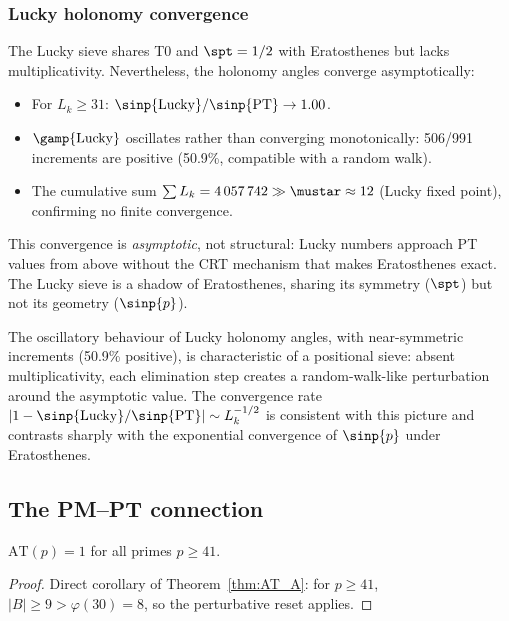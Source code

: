 \documentclass[12pt,a4paper]{article}
\begin{document}
\subsubsection{Lucky holonomy convergence}
\label{sec:PM_lucky_holonomy}

The Lucky sieve shares T0 and $\spt = 1/2$ with Eratosthenes but lacks
multiplicativity.  Nevertheless, the holonomy angles converge
asymptotically:

\begin{itemize}[nosep]
\item For $L_k \ge 31$: $\sinp{\mathrm{Lucky}} / \sinp{\mathrm{PT}} \to 1.00$.
\item $\gamp{\mathrm{Lucky}}$ oscillates rather than converging
  monotonically: 506/991 increments are positive (50.9\%, compatible
  with a random walk).
\item The cumulative sum $\sum L_k = 4\,057\,742 \gg \mustar \approx 12$
  (Lucky fixed point), confirming no finite convergence.
\end{itemize}

This convergence is \emph{asymptotic}, not structural: Lucky numbers
approach PT values from above without the CRT mechanism that makes
Eratosthenes exact.  The Lucky sieve is a shadow of Eratosthenes,
sharing its symmetry ($\spt$) but not its geometry ($\sinp{p}$).

\begin{remark}
The oscillatory behaviour of Lucky holonomy angles, with near-symmetric
increments (50.9\% positive), is characteristic of a positional sieve:
absent multiplicativity, each elimination step creates a random-walk-like
perturbation around the asymptotic value.  The convergence rate
$|1 - \sinp{\mathrm{Lucky}} / \sinp{\mathrm{PT}}| \sim L_k^{-1/2}$
is consistent with this picture and contrasts sharply with the
exponential convergence of $\sinp{p}$ under Eratosthenes.
\end{remark}


\subsection{The PM--PT connection}
\label{sec:PM_PT}

\begin{corollary}
\label{cor:PMPT}
$\mathrm{AT}(p) = 1$ for all primes $p \ge 41$.
\end{corollary}

\begin{proof}
Direct corollary of Theorem~\ref{thm:AT_A}: for $p \ge 41$, $|B| \ge 9 >
\varphi(30) = 8$, so the perturbative reset applies.
\end{proof}
\end{document}
